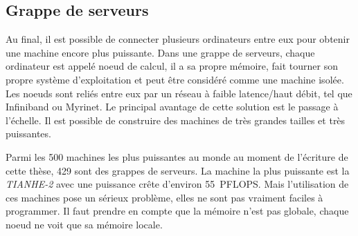 \subsection{Grappe de serveurs}
Au final, il est possible de connecter plusieurs ordinateurs entre eux pour obtenir une machine encore plus puissante.
%
Dans une grappe de serveurs, chaque ordinateur est appelé noeud de calcul, il a sa propre mémoire, fait tourner son propre système d'exploitation et peut être considéré comme une machine isolée.
%
Les noeuds sont reliés entre eux par un réseau à faible latence/haut débit, tel que Infiniband ou Myrinet.
%
Le principal avantage de cette solution est le passage à l'échelle.
%
Il est possible de construire des machines de très grandes tailles et très puissantes.



Parmi les 500 machines les plus puissantes au monde au moment de l'écriture de cette thèse, 429 sont des grappes de serveurs.
%
La machine la plus puissante est la {\em TIANHE-2} avec une puissance crête d'environ 55~PFLOPS.
%
Mais l'utilisation de ces machines pose un sérieux problème, elles ne sont pas vraiment faciles à programmer.
%
Il faut prendre en compte que la mémoire n'est pas globale, chaque noeud ne voit que sa mémoire locale.
